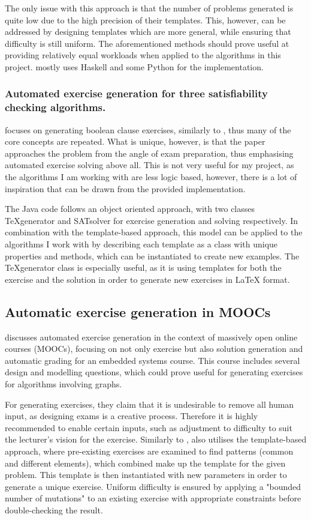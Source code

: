 \documentclass{l4proj}
\begin{document}
The only issue with this approach is that the number of problems generated is quite low due to the high precision of their templates. This, however, can be addressed by designing templates which are more general, while ensuring that difficulty is still uniform. The aforementioned methods should prove useful at providing relatively equal workloads when applied to the algorithms in this project. \citet{Hoz21} mostly uses Haskell and some Python for the implementation.

\subsubsection{Automated exercise generation for three satisfiability checking algorithms.}

\citet{Esh22} focuses on generating boolean clause exercises, similarly to \citet{Hoz21}, thus many of the core concepts are repeated. What is unique, however, is that the paper approaches the problem from the angle of exam preparation, thus emphasising automated exercise solving above all. This is not very useful for my project, as the algorithms I am working with are less logic based, however, there is a lot of inspiration that can be drawn from the provided implementation. 

The Java code follows an object oriented approach, with two classes TeXgenerator and SATsolver for exercise generation and solving respectively. In combination with the template-based approach, this model can be applied to the algorithms I work with by describing each template as a class with unique properties and methods, which can be instantiated to create new examples. The TeXgenerator class is especially useful, as it is using templates for both the exercise and the solution in order to generate new exercises in LaTeX format. 

\subsection{Automatic exercise generation in MOOCs}
\citet{Sad12} discusses automated exercise generation in the context of massively open online courses (MOOCs), focusing on not only exercise but also solution generation and automatic grading for an embedded systems course. This course includes several design and modelling questions, which could prove useful for generating exercises for algorithms involving graphs. 

For generating exercises, they claim that it is undesirable to remove all human input, as designing exams is a creative process. Therefore it is highly recommended to enable certain inputs, such as adjustment to difficulty to suit the lecturer's vision for the exercise. Similarly to \citet{Hoz21}, \citet{Sad12} also utilises the template-based approach, where pre-existing exercises are examined to find patterns (common and different elements), which combined make up the template for the given problem. This template is then instantiated with new parameters in order to generate a unique exercise. Uniform difficulty is ensured by applying a "bounded number of mutations" to an existing exercise with appropriate constraints before double-checking the result. 
\end{document}
